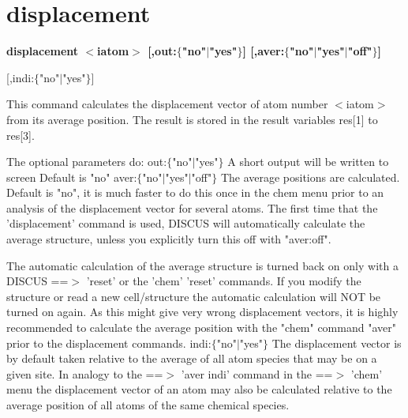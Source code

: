 \section{displacement}
{\bf displacement $ <$iatom$> $ [,out:$ \{$"no"$| $"yes"$\} $] [,aver:$ \{$"no"$| $"yes"$| $"off"$\} $] \par }
\vspace{3pt}
                     [,indi:$ \{$"no"$| $"yes"$\} $] 
\par
This command calculates the displacement vector of atom number 
$ <$iatom$> $ from its average position. The result is stored in 
the result variables res[1] to res[3]. 
\par
The optional parameters do: 
out:$ \{$"no"$| $"yes"$\} $  A short output will be written to screen 
    Default is "no" 
aver:$ \{$"no"$| $"yes"$| $"off"$\} $  The average positions are calculated. 
    Default is "no", it is much faster to do this once 
    in the chem menu prior to an analysis of the 
    displacement vector for several atoms. 
    The first time that the 'displacement' command is used, 
    DISCUS will automatically calculate the average structure, 
    unless you explicitly turn this off with "aver:off". 
\par
    The automatic calculation of the average structure is 
    turned back on only with a DISCUS ==$> $ 'reset' or the 
    'chem' 'reset' commands. If you modify the structure or 
    read a new cell/structure the automatic calculation will 
    NOT be turned on again. As this might give very wrong 
    displacement vectors, it is highly recommended to 
    calculate the average position with the "chem" 
    command "aver" prior to the displacement commands. 
indi:$ \{$"no"$| $"yes"$\} $  The displacement vector is by default 
    taken relative to the average of all atom species 
    that may be on a given site. In analogy to the 
    ==$> $ 'aver indi' command in the ==$> $ 'chem' menu 
    the displacement vector of an atom may also be 
    calculated relative to the average position of all 
    atoms of the same chemical species. 
